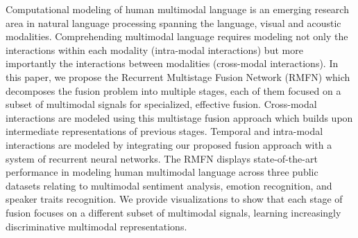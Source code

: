 Computational modeling of human multimodal language is an emerging research area in natural language processing spanning the language, visual and acoustic modalities. Comprehending multimodal language requires modeling not only the interactions within each modality (intra-modal interactions) but more importantly the interactions between modalities (cross-modal interactions). In this paper, we propose the Recurrent Multistage Fusion Network (RMFN) which decomposes the fusion problem into multiple stages, each of them focused on a subset of multimodal signals for specialized, effective fusion. Cross-modal interactions are modeled using this multistage fusion approach which builds upon intermediate representations of previous stages. Temporal and intra-modal interactions are modeled by integrating our proposed fusion approach with a system of recurrent neural networks. The RMFN displays state-of-the-art performance in modeling human multimodal language across three public datasets relating to multimodal sentiment analysis, emotion recognition, and speaker traits recognition. We provide visualizations to show that each stage of fusion focuses on a different subset of multimodal signals, learning increasingly discriminative multimodal representations.
